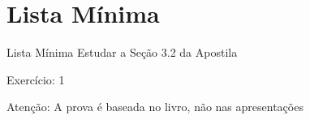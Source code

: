 \section{Lista Mínima}

\begin{frame}{Lista Mínima}
  Estudar a Seção 3.2 da Apostila

  Exercício: 1

  \vfill
  Atenção: A prova é baseada no livro, não nas apresentações
\end{frame}


